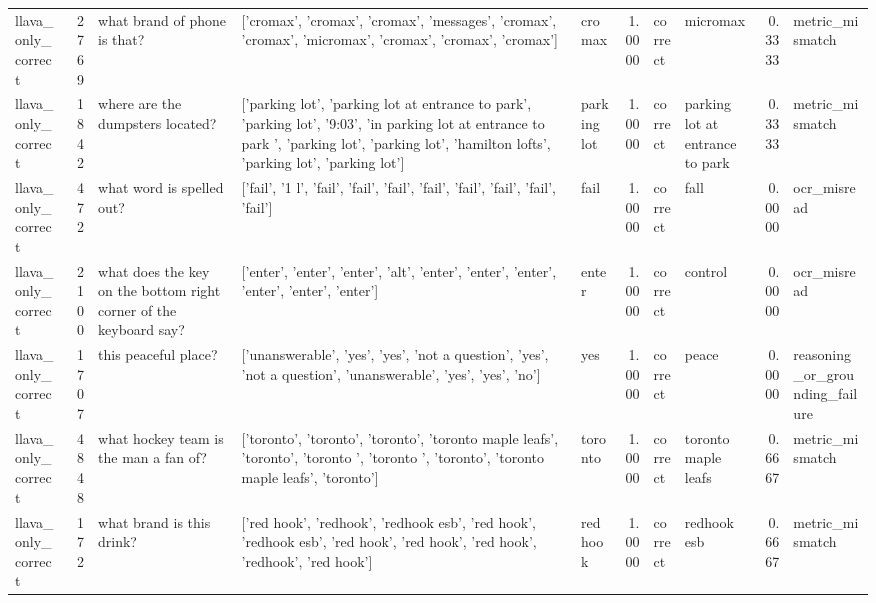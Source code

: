 \begin{tabular}{lrlllrllrl}
llava\_only\_correct & 2769 & what brand of phone is that? & ['cromax', 'cromax', 'cromax', 'messages', 'cromax', 'cromax', 'micromax', 'cromax', 'cromax', 'cromax'] & cromax & 1.0000 & correct & micromax & 0.3333 & metric\_mismatch \\
llava\_only\_correct & 1842 & where are the dumpsters located? & ['parking lot', 'parking lot at entrance to park', 'parking lot', '9:03', 'in parking lot at entrance to park ', 'parking lot', 'parking lot', 'hamilton lofts', 'parking lot', 'parking lot'] & parking lot & 1.0000 & correct & parking lot at entrance to park & 0.3333 & metric\_mismatch \\
llava\_only\_correct & 472 & what word is spelled out? & ['fail', '1 l', 'fail', 'fail', 'fail', 'fail', 'fail', 'fail', 'fail', 'fail'] & fail & 1.0000 & correct & fall & 0.0000 & ocr\_misread \\
llava\_only\_correct & 2100 & what does the key on the bottom right corner of the keyboard say? & ['enter', 'enter', 'enter', 'alt', 'enter', 'enter', 'enter', 'enter', 'enter', 'enter'] & enter & 1.0000 & correct & control & 0.0000 & ocr\_misread \\
llava\_only\_correct & 1707 & this peaceful place? & ['unanswerable', 'yes', 'yes', 'not a question', 'yes', 'not a question', 'unanswerable', 'yes', 'yes', 'no'] & yes & 1.0000 & correct & peace & 0.0000 & reasoning\_or\_grounding\_failure \\
llava\_only\_correct & 4848 & what hockey team is the man a fan of? & ['toronto', 'toronto', 'toronto', 'toronto maple leafs', 'toronto', 'toronto ', 'toronto ', 'toronto', 'toronto maple leafs', 'toronto'] & toronto & 1.0000 & correct & toronto maple leafs & 0.6667 & metric\_mismatch \\
llava\_only\_correct & 172 & what brand is this drink? & ['red hook', 'redhook', 'redhook esb', 'red hook', 'redhook esb', 'red hook', 'red hook', 'red hook', 'redhook', 'red hook'] & red hook & 1.0000 & correct & redhook esb & 0.6667 & metric\_mismatch \\
\bottomrule
\end{tabular}
